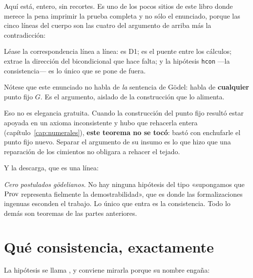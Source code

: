 Aquí está, entero, sin recortes. Es uno de los pocos sitios de este libro donde merece la pena
imprimir la prueba completa y no sólo el enunciado, porque las cinco líneas del cuerpo son las
cuatro del argumento de arriba más la contradicción:



Léase la correspondencia línea a línea:  es D1;  es el
puente entre los cálculos;  extrae la dirección del bicondicional que hace
falta; y la hipótesis \texttt{hcon} —la consistencia— es lo único que se pone de fuera.

\begin{leccion}
Nótese que este enunciado no habla de \emph{la} sentencia de Gödel: habla de \textbf{cualquier}
punto fijo $G$. Es el argumento, aislado de la construcción que lo alimenta.

Eso no es elegancia gratuita. Cuando la construcción del punto fijo resultó estar apoyada en un
axioma inconsistente y hubo que rehacerla entera (capítulo~\ref{cap:numerales}), \textbf{este
teorema no se tocó}: bastó con enchufarle el punto fijo nuevo. Separar el argumento de su insumo
es lo que hizo que una reparación de los cimientos no obligara a rehacer el tejado.
\end{leccion}

Y la descarga, que es una línea:


\begin{observacion}
\emph{Cero postulados gödelianos.} No hay ninguna hipótesis del tipo «supongamos que $\operatorname{Prov}$
representa fielmente la demostrabilidad», que es donde las formalizaciones ingenuas esconden el
trabajo. Lo único que entra es la consistencia. Todo lo demás son teoremas de las partes
anteriores.
\end{observacion}

\section{Qué consistencia, exactamente}

La hipótesis se llama , y conviene mirarla porque su nombre engaña:

